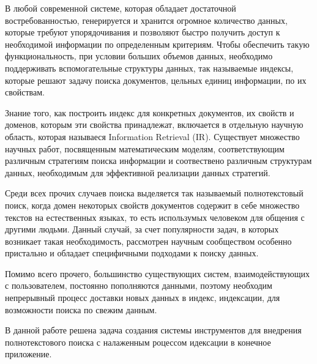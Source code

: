 
В любой современной системе, которая обладает достаточной востребованностью, генерируется и хранится огромное количество данных, которые требуют упорядочивания и позволяют быстро получить доступ к необходимой информации по определенным критериям. Чтобы обеспечить такую функциональность, при условии больших объемов данных, необходимо поддерживать вспомогательные структуры данных, так называемые индексы, которые решают задачу поиска документов, цельных единиц информации, по их свойствам.

Знание того, как построить индекс для конкретных документов, их свойств и доменов, которым эти свойства принадлежат, включается в отдельную научную область, которая называеся Information Retrieval (IR). Существует множество научных работ, посвященным математическим моделям, соответствующим различным стратегиям поиска информации и соотвествено различным структурам данных, необходимым для эффективной реализации данных стратегий.

Среди всех прочих случаев поиска выделяется так называемый полнотекстовый поиск, когда домен некоторых свойств документов содержит в себе множество текстов на естественных языках, то есть использумых человеком для общения с другими людьми. Данный случай, за счет популярности задач, в которых возникает такая необходимость, рассмотрен научным сообществом особенно пристально и обладает специфичными подходами к поиску данных.

Помимо всего прочего, большинство существующих систем, взаимодействующих с пользователем, постоянно пополняются данными, поэтому необходим непрерывный процесс доставки новых данных в индекс, индексации, для возможности поиска по свежим данным.

В данной работе решена задача создания системы инструментов для внедрения полнотекстового поиска с налаженным роцессом идексации в конечное приложение.

\clearpage
